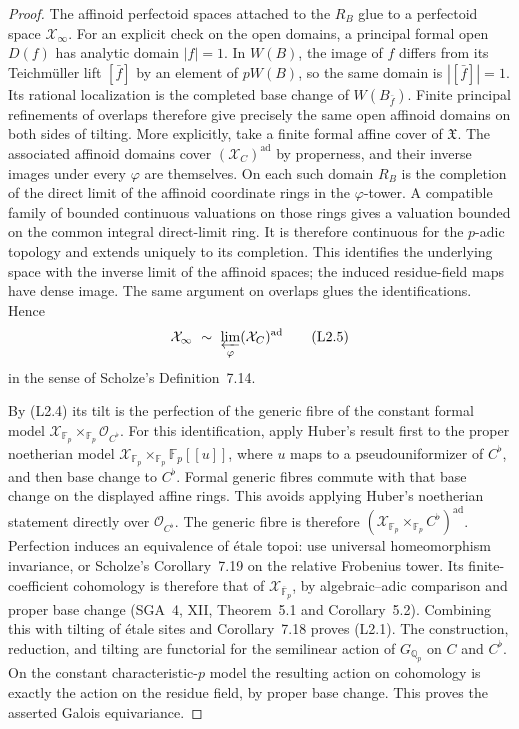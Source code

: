 \documentclass[11pt]{article}
\theoremstyle{remark}
\begin{document}
\begin{proof}
The affinoid perfectoid spaces attached to the $R_B$ glue to a
perfectoid space $\mathcal X_\infty$.  For an explicit check on the
open domains, a principal formal open $D(f)$ has analytic domain
$|f|=1$.  In $W(B)$, the image of $f$ differs from its Teichm\"uller
lift $[\bar f]$ by an element of $pW(B)$, so the same domain is
$|[\bar f]|=1$.  Its rational localization is the completed base
change of $W(B_{\bar f})$.  Finite principal refinements of overlaps
therefore give precisely the same open affinoid domains on both
sides of tilting.  More explicitly, take a finite
formal affine cover of $\mathfrak X$.  The associated affinoid domains
cover $(\mathcal X_C)^{\mathrm{ad}}$ by properness, and their inverse
images under every $\varphi$ are themselves.  On each such domain
$R_B$ is the completion of the direct limit of the affinoid coordinate
rings in the $\varphi$-tower.  A compatible family of bounded
continuous valuations on those rings gives a valuation bounded on
the common integral direct-limit ring.  It is therefore continuous
for the $p$-adic topology and extends uniquely to its completion.  This identifies
the underlying space with the inverse limit of the affinoid spaces;
the induced residue-field maps have dense image.  The same argument
on overlaps glues the identifications.  Hence
\[
 \mathcal X_\infty\ \sim\
 \varprojlim_{\varphi}(\mathcal X_C)^{\mathrm{ad}}
 \tag{L2.5}
\]
in the sense of Scholze's Definition~7.14.

By (L2.4) its tilt is the perfection of the generic fibre of the
constant formal model
$\mathcal X_{\mathbb F_p}\times_{\mathbb F_p}\mathcal O_{C^\flat}$.
For this identification, apply Huber's result first to the
proper noetherian model
$\mathcal X_{\mathbb F_p}\times_{\mathbb F_p}\mathbb F_p[[u]]$,
where $u$ maps to a pseudouniformizer of $C^\flat$, and then base change
to $C^\flat$.  Formal generic fibres commute with that base change on
the displayed affine rings.  This avoids applying Huber's noetherian
statement directly over $\mathcal O_{C^\flat}$.  The generic fibre is
therefore
$(\mathcal X_{\mathbb F_p}\times_{\mathbb F_p}C^\flat)^{\mathrm{ad}}$.
Perfection induces an equivalence of \'etale topoi: use universal
homeomorphism invariance, or Scholze's Corollary~7.19 on the relative
Frobenius tower.  Its finite-coefficient cohomology is therefore that
of $\mathcal X_{\overline{\mathbb F}_p}$, by algebraic--adic comparison
and proper base change (SGA~4, XII, Theorem~5.1 and Corollary~5.2).
Combining this with tilting of \'etale sites and Corollary~7.18 proves
(L2.1).  The construction, reduction, and tilting are functorial for
the semilinear action of $G_{\mathbb Q_p}$ on $C$ and $C^\flat$.
On the constant characteristic-$p$ model the resulting action on
cohomology is exactly the action on the residue field, by proper base
change.  This proves the asserted Galois equivariance.


\end{proof}
\end{document}
